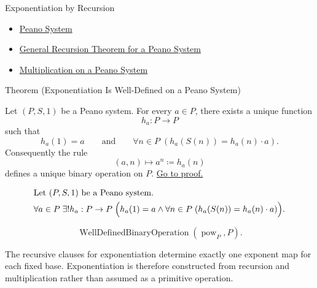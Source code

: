 \begin{topicbox}{Exponentiation by Recursion}
\begin{dependencies}
\begin{itemize}
  \item \hyperref[def:peano-system]{Peano System}
  \item \hyperref[thm:general-recursion-theorem-for-peano-system]{General Recursion Theorem for a Peano System}
  \item \hyperref[def:multiplication-on-peano-system]{Multiplication on a Peano System}
\end{itemize}
\end{dependencies}

\begin{theorembox}{Theorem (Exponentiation Is Well-Defined on a Peano System)}
\begin{theorem}
\label{thm:exponentiation-well-defined-on-peano-system}
Let $(P,S,1)$ be a Peano system. For every $a \in P$, there exists a unique
function
\[
h_a:P\to P
\]
such that
\[
h_a(1)=a
\qquad\text{and}\qquad
\forall n \in P\;(h_a(S(n))=h_a(n)\cdot a).
\]
Consequently the rule
\[
(a,n)\longmapsto a^n\coloneqq h_a(n)
\]
defines a unique binary operation on $P$.
\hyperref[prf:exponentiation-well-defined-on-peano-system]{Go to proof.}
\end{theorem}
\end{theorembox}

\begin{remark*}
\[
\begin{aligned}
&\text{Let } (P,S,1) \text{ be a Peano system.}\\
&\forall a \in P\;\exists! h_a:P\to P\;
\Bigl(h_a(1)=a \land
\forall n \in P\;(h_a(S(n))=h_a(n)\cdot a)\Bigr).
\end{aligned}
\]
\end{remark*}

\begin{remark*}
\[
\operatorname{WellDefinedBinaryOperation}(\operatorname{pow}_P,P).
\]
\end{remark*}

\begin{remark*}[Interpretation]
The recursive clauses for exponentiation determine exactly one exponent map
for each fixed base. Exponentiation is therefore constructed from recursion
and multiplication rather than assumed as a primitive operation.



\end{remark*}
\end{topicbox}
